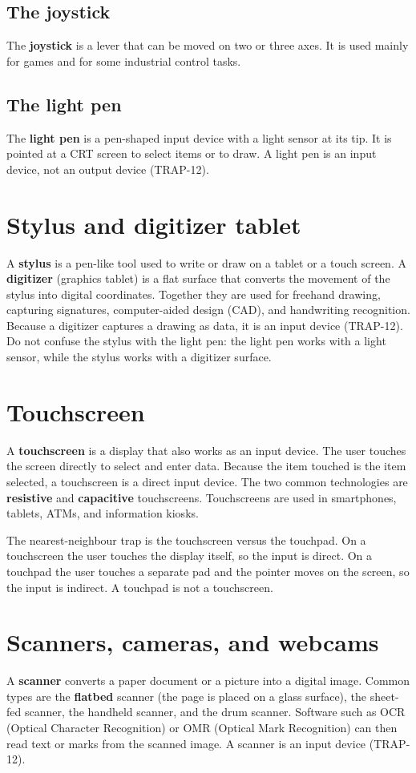 \documentclass[11pt]{article}
\begin{document}
\subsection{The joystick}
The \textbf{joystick} is a lever that can be moved on two or three axes. It is
used mainly for games and for some industrial control tasks.

\subsection{The light pen}
The \textbf{light pen} is a pen-shaped input device with a light sensor at its
tip. It is pointed at a CRT screen to select items or to draw. A light pen is
an input device, not an output device (TRAP-12).

\section{Stylus and digitizer tablet}
A \textbf{stylus} is a pen-like tool used to write or draw on a tablet or a
touch screen. A \textbf{digitizer} (graphics tablet) is a flat surface that
converts the movement of the stylus into digital coordinates. Together they
are used for freehand drawing, capturing signatures, computer-aided design
(CAD), and handwriting recognition. Because a digitizer captures a drawing as
data, it is an input device (TRAP-12). Do not confuse the stylus with the
light pen: the light pen works with a light sensor, while the stylus works
with a digitizer surface.

\section{Touchscreen}
A \textbf{touchscreen} is a display that also works as an input device. The
user touches the screen directly to select and enter data. Because the item
touched is the item selected, a touchscreen is a direct input device. The two
common technologies are \textbf{resistive} and \textbf{capacitive}
touchscreens. Touchscreens are used in smartphones, tablets, ATMs, and
information kiosks.

The nearest-neighbour trap is the touchscreen versus the touchpad. On a
touchscreen the user touches the display itself, so the input is direct. On a
touchpad the user touches a separate pad and the pointer moves on the screen,
so the input is indirect. A touchpad is not a touchscreen.

\section{Scanners, cameras, and webcams}
A \textbf{scanner} converts a paper document or a picture into a digital
image. Common types are the \textbf{flatbed} scanner (the page is placed on a
glass surface), the sheet-fed scanner, the handheld scanner, and the drum
scanner. Software such as OCR (Optical Character Recognition) or OMR (Optical
Mark Recognition) can then read text or marks from the scanned image. A
scanner is an input device (TRAP-12).
\end{document}
